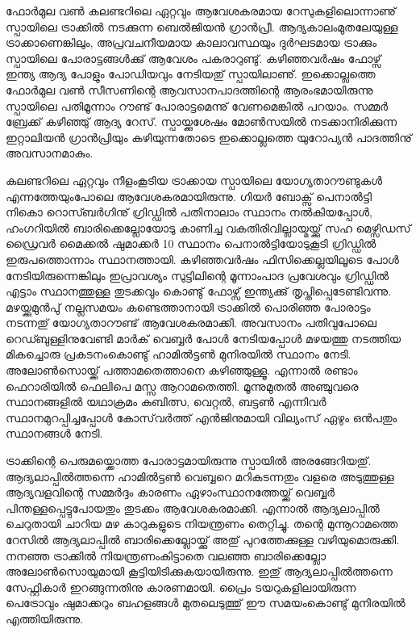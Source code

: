 ﻿
\vskip 2pt

ഫോര്‍മുല വണ്‍ കലണ്ടറിലെ ഏറ്റവും ആവേശകരമായ റേസുകളിലൊന്നാണു് സ്പായിലെ ട്രാക്കില്‍ നടക്കുന്ന 
ബെല്‍ജിയന്‍ ഗ്രാന്‍പ്രീ. ആദ്യകാലംമുതലേയുള്ള ട്രാക്കാണെങ്കിലും, അപ്രവചനീയമായ കാലാവസ്ഥയും ദുര്‍ഘടമായ 
ട്രാക്കും സ്പായിലെ പോരാട്ടങ്ങള്‍ക്കു് ആവേശം പകരാറുണ്ടു്. കഴിഞ്ഞവര്‍ഷം ഫോഴ്സ് ഇന്ത്യ ആദ്യ പോളും പോഡിയവും 
നേടിയതു് സ്പായിലാണു്. ഇക്കൊല്ലത്തെ ഫോര്‍മുല വണ്‍ സീസണിന്റെ ആവസാനപാദത്തിന്റെ ആരംഭമായിരുന്നു 
സ്പായിലെ പതിമൂന്നാം റൗണ്ട് പോരാട്ടമെന്നു് വേണമെങ്കില്‍ പറയാം. സമ്മര്‍ ബ്രേക്ക് കഴിഞ്ഞു് ആദ്യ റേസ്. 
സ്പായ്ക്കുശേഷം മോണ്‍സയില്‍ നടക്കാനിരിക്കുന്ന ഇറ്റാലിയന്‍ ഗ്രാന്‍പ്രിയും കഴിയുന്നതോടെ ഇക്കൊല്ലത്തെ യുറോപ്യന്‍ 
പാദത്തിനു് അവസാനമാകും.

കലണ്ടറിലെ ഏറ്റവും നീളംകൂടിയ ട്രാക്കായ സ്പായിലെ യോഗ്യതാറൗണ്ടുകള്‍ എന്നത്തേയുംപോലെ 
ആവേശകരമായിരുന്നു. ഗിയര്‍ ബോക്സ് പെനാല്‍ട്ടി നികൊ റൊസ്ബര്‍ഗിനു് ഗ്രിഡ്ഡില്‍ പതിനാലാം സ്ഥാനം 
നല്‍കിയപ്പോള്‍, ഹംഗറിയില്‍ ബാരിക്കെല്ലോയോടു കാണിച്ച വകതിരിവില്ലായ്മയ്ക്കു് സഹ മെഴ്സിഡസ് ഡ്രൈവര്‍ മൈക്കല്‍ 
ഷുമാക്കര്‍ 10 സ്ഥാനം പെനാല്‍ട്ടിയോടുകൂടി ഗ്രിഡ്ഡില്‍ ഇരുപത്തൊന്നാം സ്ഥാനത്തായി. കഴിഞ്ഞവര്‍ഷം ഫിസിക്കെല്ലയിലൂടെ 
പോള്‍ നേടിയിരുന്നെങ്കിലും ഇപ്രാവശ്യം സുട്ടിലിന്റെ മൂന്നാംപാദ പ്രവേശവും ഗ്രിഡ്ഡില്‍ എട്ടാം സ്ഥാനത്തുള്ള തുടക്കവും 
കൊണ്ടു് ഫോഴ്സ് ഇന്ത്യക്കു് തൃപ്തിപ്പെടേണ്ടിവന്നു. മഴയ്ക്കുമുന്‍പു് നല്ലസമയം കണ്ടെത്താനായി ട്രാക്കില്‍ പൊരിഞ്ഞ പോരാട്ടം 
നടന്നതു് യോഗ്യതാറൗണ്ട് ആവേശകരമാക്കി. അവസാനം പതിവുപോലെ റെഡ്ബുള്ളിനുവേണ്ടി മാര്‍ക് വെബ്ബര്‍ 
പോള്‍ നേടിയപ്പോള്‍ മഴയത്തു നടത്തിയ മികച്ചൊരു പ്രകടനംകൊണ്ടു് ഹാമില്‍ട്ടണ്‍ മുനിരയില്‍ സ്ഥാനം നേടി. 
അലോണ്‍സൊയ്ക്ക് പത്താമതെത്താനെ കഴിഞ്ഞുള്ളൂ. എന്നാല്‍ രണ്ടാം ഫെറാരിയില്‍ ഫെലിപെ മസ്സ ആറാമതെത്തി. 
മൂന്നുമുതല്‍ അഞ്ചുവരെ സ്ഥാനങ്ങളില്‍ യഥാക്രമം കുബിത്സ, വെറ്റല്‍, ബട്ടണ്‍ എന്നിവര്‍ സ്ഥാനമുറപ്പിച്ചപ്പോള്‍ 
കോസ്‌വര്‍ത്ത് എന്‍ജിനുമായി വില്യംസ് ഏഴും ഒന്‍പതും സ്ഥാനങ്ങള്‍ നേടി.

ട്രാക്കിന്റെ പെരുമയ്ക്കൊത്ത പോരാട്ടമായിരുന്നു സ്പായില്‍ അരങ്ങേറിയതു്. ആദ്യലാപ്പില്‍ത്തന്നെ ഹാമില്‍ട്ടണ്‍ വെബ്ബറെ 
മറികടന്നതും വളരെ അടുത്തുള്ള ആദ്യവളവിന്റെ സമ്മര്‍ദ്ദം കാരണം ഏഴാംസ്ഥാനത്തേയ്ക്ക് വെബ്ബര്‍ 
പിന്തള്ളപ്പെട്ടുപോയതും തുടക്കം ആവേശകരമാക്കി. എന്നാല്‍ ആദ്യലാപ്പില്‍ ചെറുതായി ചാറിയ മഴ കാറുകളുടെ നിയന്ത്രണം തെറ്റിച്ചു. തന്റെ മുന്നൂറാമത്തെ റേസില്‍ ആദ്യലാപ്പില്‍ ബാരിക്കെല്ലോയ്ക്കു് അതു് 
പുറത്തേക്കുള്ള വഴിയുമൊരുക്കി. നനഞ്ഞ ട്രാക്കില്‍ നിയന്ത്രണംകിട്ടാതെ വലഞ്ഞ ബാരിക്കെല്ലോ അലോണ്‍സൊയുമായി 
കൂട്ടിയിടിക്കുകയായിരുന്നു. ഇതു് ആദ്യലാപ്പില്‍ത്തന്നെ സേഫ്റ്റികാര്‍ ഇറങ്ങുന്നതിനു കാരണമായി. പ്രൈം 
ടയറുകളിലായിരുന്ന പെട്രോവും ഷുമാക്കറും ബഹളങ്ങള്‍ മുതലെടുത്തു് ഈ സമയംകൊണ്ടു് മുനിരയില്‍ 
എത്തിയിരുന്നു.


